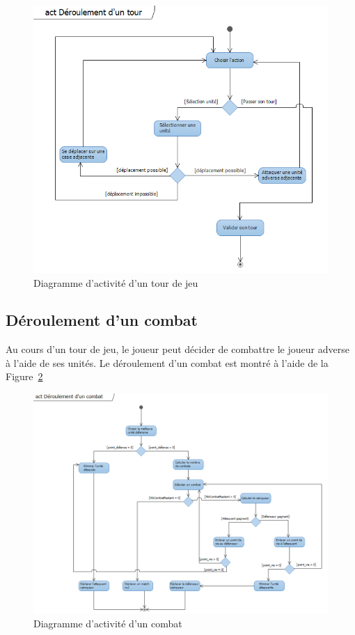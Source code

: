 \documentclass[a4paper]{article}%
\begin{document}
\begin{figure}[H]
    \centering
    \includegraphics[width=\textwidth]{./images/interaction/tourdejeu.png}
		\caption{Diagramme d'activité d'un tour de jeu}
		\label{fig:inter_tourdejeu}
\end{figure}

\subsection{Déroulement d'un combat}
Au cours d'un tour de jeu, le joueur peut décider de combattre le joueur adverse à l'aide de ses unités. Le déroulement d'un combat est montré à l'aide de la Figure~\ref{fig:inter_combat}

\begin{figure}[H]
    \centering
    \includegraphics[width=\textwidth]{./images/interaction/combat.png}
		\caption{Diagramme d'activité d'un combat}
		\label{fig:inter_combat}
\end{figure}
\end{document}
